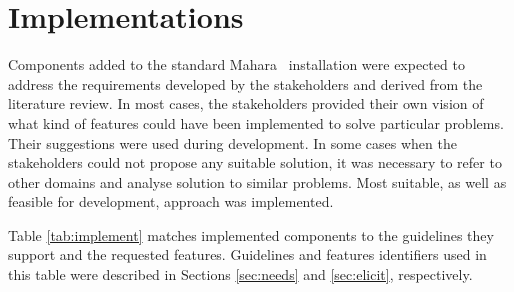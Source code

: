 \section{Implementations}

Components added to the standard Mahara \ep~installation were expected to
address the requirements developed by the stakeholders and derived from the
literature review. In most cases, the stakeholders provided their own vision of
what kind of features could have been implemented to solve particular problems.
Their suggestions were used during development. In some cases when the
stakeholders could not propose any suitable solution, it was necessary to refer
to other domains and analyse solution to similar problems. Most suitable, as
well as feasible for development, approach was implemented.

Table \ref{tab:implement} matches implemented components to the guidelines they
support and the requested features. Guidelines and features identifiers used in
this table were described in Sections \ref{sec:needs} and \ref{sec:elicit},
respectively.

